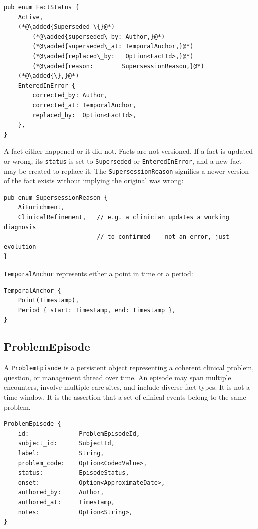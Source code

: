\documentclass[11pt]{article}
\newcommand{\added}[1]{\textcolor{accentblue}{#1}}
\begin{document}
\begin{lstlisting}
pub enum FactStatus {
    Active,
    (*@\added{Superseded \{}@*)
        (*@\added{superseded\_by: Author,}@*)
        (*@\added{superseded\_at: TemporalAnchor,}@*)
        (*@\added{replaced\_by:   Option<FactId>,}@*)
        (*@\added{reason:        SupersessionReason,}@*)
    (*@\added{\},}@*)
    EnteredInError {
        corrected_by: Author,
        corrected_at: TemporalAnchor,
        replaced_by:  Option<FactId>,
    },
}
\end{lstlisting}


A fact either happened or it did not. Facts are not versioned. If a fact is
updated or wrong, its \texttt{status} is set to \texttt{Superseded} or
\texttt{EnteredInError}, and a new fact may be created to replace it.
The \texttt{SupersessionReason} signifies a newer version of the fact exists without implying the original was wrong:
\begin{lstlisting}
pub enum SupersessionReason {
    AiEnrichment,
    ClinicalRefinement,   // e.g. a clinician updates a working diagnosis
                          // to confirmed -- not an error, just evolution
}
\end{lstlisting}

\texttt{TemporalAnchor} represents either a point in time or a period:

\begin{lstlisting}
TemporalAnchor {
    Point(Timestamp),
    Period { start: Timestamp, end: Timestamp },
}
\end{lstlisting}

\subsection{ProblemEpisode}

A \texttt{ProblemEpisode} is a persistent object representing a coherent
clinical problem, question, or management thread over time. An episode may
span multiple encounters, involve multiple care sites, and include diverse
fact types. It is not a time window. It is the assertion that a set of
clinical events belong to the same problem.

\begin{lstlisting}
ProblemEpisode {
    id:              ProblemEpisodeId,
    subject_id:      SubjectId,
    label:           String,
    problem_code:    Option<CodedValue>,
    status:          EpisodeStatus,
    onset:           Option<ApproximateDate>,
    authored_by:     Author,
    authored_at:     Timestamp,
    notes:           Option<String>,
}
\end{lstlisting}
\end{document}
